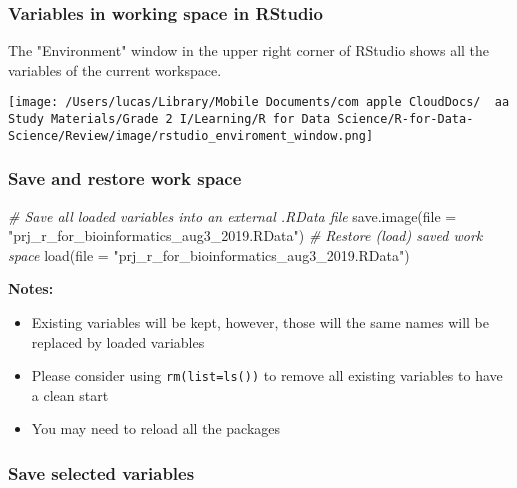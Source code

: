 \documentclass[
]{article}
\newenvironment{Shaded}{}{}
\newcommand{\AttributeTok}[1]{\textcolor[rgb]{0.49,0.56,0.16}{#1}}
\newcommand{\CommentTok}[1]{\textcolor[rgb]{0.38,0.63,0.69}{\textit{#1}}}
\newcommand{\FunctionTok}[1]{\textcolor[rgb]{0.02,0.16,0.49}{#1}}
\newcommand{\NormalTok}[1]{#1}
\newcommand{\StringTok}[1]{\textcolor[rgb]{0.25,0.44,0.63}{#1}}
\begin{document}
\hypertarget{variables-in-working-space-in-rstudio}{%
\subsubsection{Variables in working space in
RStudio}\label{variables-in-working-space-in-rstudio}}

The "Environment" window in the upper right corner of RStudio shows all
the variables of the current workspace.

\texttt{[image: /Users/lucas/Library/Mobile Documents/com~apple~CloudDocs/~~aa Study Materials/Grade 2 I/Learning/R for Data Science/R-for-Data-Science/Review/image/rstudio\_enviroment\_window.png]}

\hypertarget{save-and-restore-work-space}{%
\subsubsection{Save and restore work
space}\label{save-and-restore-work-space}}

\begin{Shaded}
\begin{Highlighting}[]
\CommentTok{\# Save all loaded variables into an external .RData file}
\FunctionTok{save.image}\NormalTok{(}\AttributeTok{file =} \StringTok{"prj\_r\_for\_bioinformatics\_aug3\_2019.RData"}\NormalTok{) }
\CommentTok{\# Restore (load) saved work space}
\FunctionTok{load}\NormalTok{(}\AttributeTok{file =} \StringTok{"prj\_r\_for\_bioinformatics\_aug3\_2019.RData"}\NormalTok{)}
\end{Highlighting}
\end{Shaded}

\textbf{Notes:}

\begin{itemize}
\item
  Existing variables will be kept, however, those will the same names
  will be replaced by loaded variables
\item
  Please consider using \texttt{rm(list=ls())} to remove all existing
  variables to have a clean start
\item
  You may need to reload all the packages
\end{itemize}

\hypertarget{save-selected-variables}{%
\subsubsection{Save selected variables}\label{save-selected-variables}}
\end{document}
